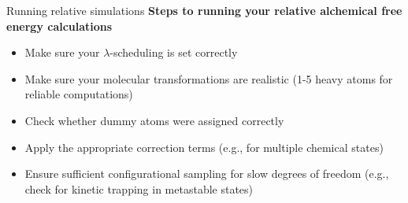 \documentclass[9pt,bestpractices]{livecoms}
\begin{document}
\begin{Checklists*}
\begin{checklist}{Running relative simulations}
        \textbf{Steps to running your relative alchemical free energy calculations}
\begin{itemize}
    \item Make sure your $\lambda$-scheduling is set correctly
    \item Make sure your molecular transformations are realistic (1-5 heavy atoms for reliable computations)
    \item Check whether dummy atoms were assigned correctly
     \item Apply the appropriate correction terms (e.g., for multiple chemical states)
     \item Ensure sufficient configurational sampling for slow degrees of freedom (e.g., check for kinetic trapping in metastable states)
\end{itemize}
\end{checklist}
\end{Checklists*}
\end{document}
